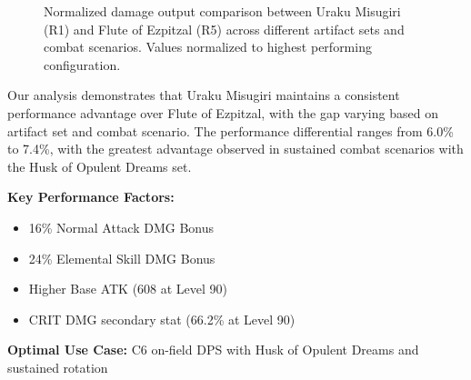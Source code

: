 \documentclass[12pt,a4paper]{article}
\begin{document}
\begin{figure}[H]
\centering
{}
\caption{Normalized damage output comparison between Uraku Misugiri (R1) and Flute of Ezpitzal (R5) across different artifact sets and combat scenarios. Values normalized to highest performing configuration.}
\label{fig:weapon_comparison}
\end{figure}

Our analysis demonstrates that Uraku Misugiri maintains a consistent performance advantage over Flute of Ezpitzal, with the gap varying based on artifact set and combat scenario. The performance differential ranges from 6.0\% to 7.4\%, with the greatest advantage observed in sustained combat scenarios with the Husk of Opulent Dreams set.

\begin{tcolorbox}[colback=geodark!5, colframe=geodark, title=Uraku Misugiri (R1)]
\textbf{Key Performance Factors:}
\begin{itemize}
    \item 16\% Normal Attack DMG Bonus
    \item 24\% Elemental Skill DMG Bonus
    \item Higher Base ATK (608 at Level 90)
    \item CRIT DMG secondary stat (66.2\% at Level 90)
\end{itemize}

\textbf{Optimal Use Case:} C6 on-field DPS with Husk of Opulent Dreams and sustained rotation
\end{tcolorbox}
\end{document}
